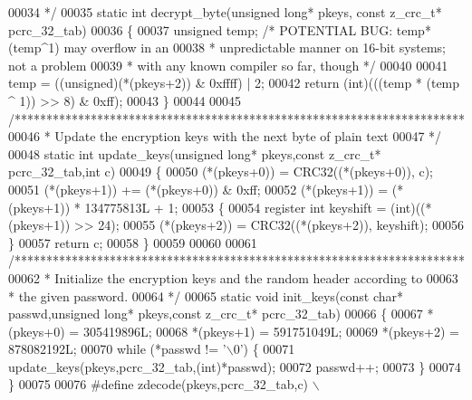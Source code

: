 \begin{DoxyCode}
00034 \textcolor{comment}{ */}
00035 \textcolor{keyword}{static} \textcolor{keywordtype}{int} decrypt\_byte(\textcolor{keywordtype}{unsigned} \textcolor{keywordtype}{long}* pkeys, \textcolor{keyword}{const} z\_crc\_t* pcrc\_32\_tab)
00036 \{
00037     \textcolor{keywordtype}{unsigned} temp;  \textcolor{comment}{/* POTENTIAL BUG:  temp*(temp^1) may overflow in an}
00038 \textcolor{comment}{                     * unpredictable manner on 16-bit systems; not a problem}
00039 \textcolor{comment}{                     * with any known compiler so far, though */}
00040 
00041     temp = ((unsigned)(*(pkeys+2)) & 0xffff) | 2;
00042     \textcolor{keywordflow}{return} (\textcolor{keywordtype}{int})(((temp * (temp ^ 1)) >> 8) & 0xff);
00043 \}
00044 
00045 \textcolor{comment}{/***********************************************************************}
00046 \textcolor{comment}{ * Update the encryption keys with the next byte of plain text}
00047 \textcolor{comment}{ */}
00048 \textcolor{keyword}{static} \textcolor{keywordtype}{int} update\_keys(\textcolor{keywordtype}{unsigned} \textcolor{keywordtype}{long}* pkeys,\textcolor{keyword}{const} z\_crc\_t* pcrc\_32\_tab,\textcolor{keywordtype}{int} c)
00049 \{
00050     (*(pkeys+0)) = CRC32((*(pkeys+0)), c);
00051     (*(pkeys+1)) += (*(pkeys+0)) & 0xff;
00052     (*(pkeys+1)) = (*(pkeys+1)) * 134775813L + 1;
00053     \{
00054       \textcolor{keyword}{register} \textcolor{keywordtype}{int} keyshift = (int)((*(pkeys+1)) >> 24);
00055       (*(pkeys+2)) = CRC32((*(pkeys+2)), keyshift);
00056     \}
00057     \textcolor{keywordflow}{return} c;
00058 \}
00059 
00060 
00061 \textcolor{comment}{/***********************************************************************}
00062 \textcolor{comment}{ * Initialize the encryption keys and the random header according to}
00063 \textcolor{comment}{ * the given password.}
00064 \textcolor{comment}{ */}
00065 \textcolor{keyword}{static} \textcolor{keywordtype}{void} init\_keys(\textcolor{keyword}{const} \textcolor{keywordtype}{char}* passwd,\textcolor{keywordtype}{unsigned} \textcolor{keywordtype}{long}* pkeys,\textcolor{keyword}{const} z\_crc\_t* pcrc\_32\_tab)
00066 \{
00067     *(pkeys+0) = 305419896L;
00068     *(pkeys+1) = 591751049L;
00069     *(pkeys+2) = 878082192L;
00070     \textcolor{keywordflow}{while} (*passwd != \textcolor{charliteral}{'\(\backslash\)0'}) \{
00071         update\_keys(pkeys,pcrc\_32\_tab,(\textcolor{keywordtype}{int})*passwd);
00072         passwd++;
00073     \}
00074 \}
00075 
00076 \textcolor{preprocessor}{#define zdecode(pkeys,pcrc\_32\_tab,c) \(\backslash\)}

\end{DoxyCode}
